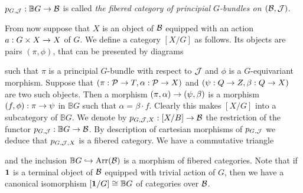 \begin{definition}
$p_{G,{\mathcal J}}:\mathbb{B}G\rightarrow {\mathcal B}$ is called \textit{the fibered category of principial $G$-bundles on $({\mathcal B},{\mathcal J})$}.
\end{definition}
\noindent
From now suppose that $X$ is an object of ${\mathcal B}$ equipped with an action $a:G\times X\rightarrow X$ of $G$. We define a category $[X/G]$ as follows. Its objects are pairs $(\pi,\phi)$, that can be presented by diagrams
\begin{center}
\end{center}
such that $\pi$ is a principial $G$-bundle with respect to ${\mathcal J}$ and $\phi$ is a $G$-equivariant morphism. Suppose that $(\pi:{\mathcal P}\rightarrow T,\alpha:{\mathcal P}\rightarrow X)$ and $(\psi:Q\rightarrow Z,\beta:Q\rightarrow X)$ are two such objects. Then a morphism $(\pi,\alpha)\rightarrow (\psi,\beta)$ is a morphism $(f,\phi):\pi\rightarrow \psi$ in $\mathbb{B}G$ such that $\alpha = \beta\cdot f$. Clearly this makes $[X/G]$ into a subcategory of $\mathbb{B}G$. We denote by $p_{G,{\mathcal J},X}:[X/B]\rightarrow {\mathcal B}$ the restriction of the functor $p_{G,{\mathcal J}}:\mathbb{B}G\rightarrow {\mathcal B}$. By description of cartesian morphisms of $p_{G,{\mathcal J}}$ we deduce that $p_{G,{\mathcal J},X}$ is a fibered category. We have a commutative triangle
\begin{center}
\end{center}
and the inclusion $\mathbb{B}G\hookrightarrow \mathrm{Arr}({\mathcal B})$ is a morphism of fibered categories. Note that if $\mathbf{1}$ is a terminal object of ${\mathcal B}$ equipped with trivial action of $G$, then we have a canonical isomorphism $[\mathbf{1}/G] \cong \mathbb{B}G$ of categories over ${\mathcal B}$.

